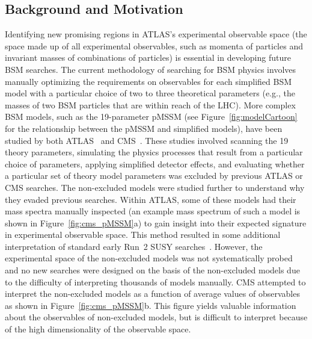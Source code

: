 \documentclass[letter, USenglish, 11pt, subfigure]{article}
\begin{document}
\clearpage

\subsection{Background and Motivation}

Identifying new promising regions in ATLAS's experimental observable space (the space made up of all experimental observables, such as momenta of particles and invariant masses of combinations of particles) is essential in developing future BSM searches.
The current methodology of searching for BSM physics involves manually optimizing the requirements on observables for each simplified BSM model with a particular choice of two to three theoretical parameters (e.g., the masses of two BSM particles that are within reach of the LHC). More complex BSM models, such as the 19-parameter pMSSM (see Figure~\ref{fig:modelCartoon} for the relationship between the pMSSM and simplified models), have been studied by both ATLAS~\cite{ATLAS_pMSSM} and CMS~\cite{CMS_pMSSM}. These studies involved scanning the 19 theory parameters, simulating the physics processes that result from a particular choice of parameters, applying simplified detector effects, and evaluating whether a particular set of theory model parameters was excluded by previous ATLAS or CMS searches. The non-excluded models were studied further to understand why they evaded previous searches. Within ATLAS, some of these models had their mass spectra manually inspected (an example mass spectrum of such a model is shown in Figure~\ref{fig:cms_pMSSM}a) to gain insight into their expected signature in experimental observable space. This method resulted in some additional interpretation of standard early Run~2 SUSY searches~\cite{stopEarlyRun2}. However, the experimental space of the non-excluded models was not systematically probed and no new searches were designed on the basis of the non-excluded models due to the difficulty of interpreting thousands of models manually. CMS attempted to interpret the non-excluded models as a function of average values of observables as shown in Figure~\ref{fig:cms_pMSSM}b. This figure yields valuable information about the observables of non-excluded models, but is difficult to interpret because of the high dimensionality of the observable space. 
\end{document}

